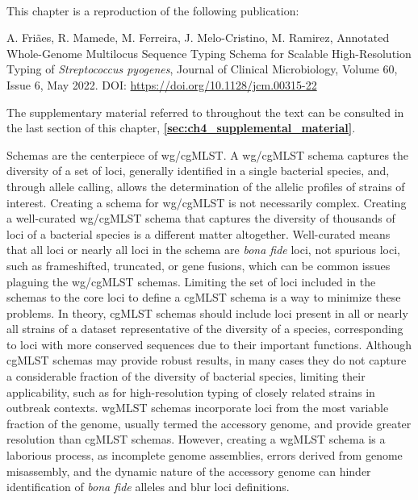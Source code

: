 \mbox{}\\
\vspace{8cm}

This chapter is a reproduction of the following publication:

A. Friães, R. Mamede, M. Ferreira, J. Melo-Cristino, M. Ramirez, Annotated Whole-Genome Multilocus Sequence Typing Schema for Scalable High-Resolution Typing of \textit{Streptococcus pyogenes}, Journal of Clinical Microbiology, Volume 60, Issue 6, May 2022. DOI: \url{https://doi.org/10.1128/jcm.00315-22}

The supplementary material referred to throughout the text can be consulted in the last section of this chapter, \textbf{\autoref{sec:ch4_supplemental_material}}.

Schemas are the centerpiece of \ac{wg/cgMLST}. A \ac{wg/cgMLST} schema captures the diversity of a set of loci, generally identified in a single bacterial species, and, through allele calling, allows the determination of the allelic profiles of strains of interest. Creating a schema for \ac{wg/cgMLST} is not necessarily complex. Creating a well-curated \ac{wg/cgMLST} schema that captures the diversity of thousands of loci of a bacterial species is a different matter altogether. Well-curated means that all loci or nearly all loci in the schema are \textit{bona fide} loci, not spurious loci, such as frameshifted, truncated, or gene fusions, which can be common issues plaguing the \ac{wg/cgMLST} schemas. Limiting the set of loci included in the schemas to the core loci to define a \ac{cgMLST} schema is a way to minimize these problems. In theory, \ac{cgMLST} schemas should include loci present in all or nearly all strains of a dataset representative of the diversity of a species, corresponding to loci with more conserved sequences due to their important functions. Although \ac{cgMLST} schemas may provide robust results, in many cases they do not capture a considerable fraction of the diversity of bacterial species, limiting their applicability, such as for high-resolution typing of closely related strains in outbreak contexts. \ac{wgMLST} schemas incorporate loci from the most variable fraction of the genome, usually termed the accessory genome, and provide greater resolution than \ac{cgMLST} schemas. However, creating a \ac{wgMLST} schema is a laborious process, as incomplete genome assemblies, errors derived from genome misassembly, and the dynamic nature of the accessory genome can hinder identification of \textit{bona fide} alleles and blur loci definitions.

